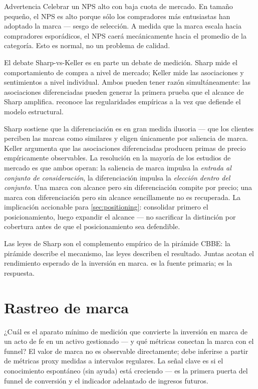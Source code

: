 \begin{admonition}{Advertencia}
Celebrar un NPS alto con baja cuota de mercado. En tamaño pequeño, el NPS es alto porque sólo los compradores más entusiastas han adoptado la marca --- sesgo de selección. A medida que la marca escala hacia compradores esporádicos, el NPS caerá mecánicamente hacia el promedio de la categoría. Esto es normal, no un problema de calidad.
\end{admonition}

El debate Sharp-vs-Keller es en parte un debate de medición. Sharp mide el comportamiento de compra a nivel de mercado; Keller mide las asociaciones y sentimientos a nivel individual. Ambos pueden tener razón simultáneamente: las asociaciones diferenciadas pueden generar la primera prueba que el alcance de Sharp amplifica. \textcite{keller2019} reconoce las regularidades empíricas a la vez que defiende el modelo estructural.

Sharp sostiene que la diferenciación es en gran medida ilusoria --- que los clientes perciben las marcas como similares y eligen únicamente por saliencia de marca. Keller argumenta que las asociaciones diferenciadas producen primas de precio empíricamente observables. La resolución en la mayoría de los estudios de mercado es que ambos operan: la saliencia de marca impulsa la \emph{entrada al conjunto de consideración}, la diferenciación impulsa la \emph{elección dentro del conjunto}. Una marca con alcance pero sin diferenciación compite por precio; una marca con diferenciación pero sin alcance sencillamente no es recuperada. La implicación accionable para \cref{sec:positioning}: consolidar primero el posicionamiento, luego expandir el alcance --- no sacrificar la distinción por cobertura antes de que el posicionamiento sea defendible.

Las leyes de Sharp son el complemento empírico de la pirámide CBBE: la pirámide describe el mecanismo, las leyes describen el resultado. Juntas acotan el rendimiento esperado de la inversión en marca. \textcite{sharp2010} es la fuente primaria; \textcite{keller2019} es la respuesta.

\section{Rastreo de marca}\label{sec:brand-tracking}

¿Cuál es el aparato mínimo de medición que convierte la inversión en marca de un acto de fe en un activo gestionado --- y qué métricas conectan la marca con el funnel? El valor de marca no es observable directamente; debe inferirse a partir de métricas proxy medidas a intervalos regulares. La señal clave es si el conocimiento espontáneo (sin ayuda) está creciendo --- es la primera puerta del funnel de conversión y el indicador adelantado de ingresos futuros.


